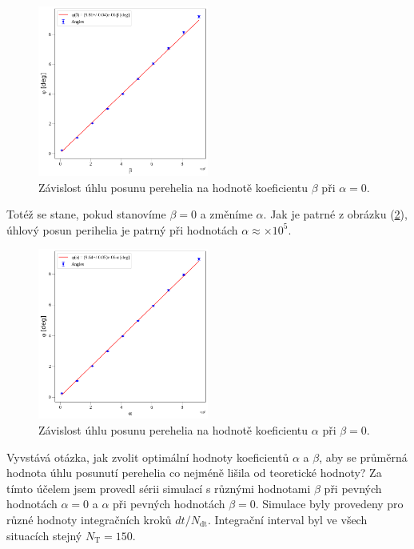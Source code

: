 \documentclass[a4paper,11pt,twocolumn]{article}
\begin{document}
            \begin{figure}
                \centering
                \includegraphics[width=0.5\textwidth]{phi_alpha.png}
                \caption{Závislost úhlu posunu perehelia na hodnotě koeficientu $\beta$ při $\alpha = 0$.}
                \label{fig:phi_alpha}
            \end{figure}

            Totéž se stane, pokud stanovíme $\beta = 0$ a změníme $\alpha$. Jak je patrné z obrázku (\ref{fig:phi_beta}), úhlový posun perihelia je patrný při hodnotách $\alpha \approx \times 10^5$.

            \begin{figure}
                \centering
                \includegraphics[width=0.5\textwidth]{phi_beta.png}
                \caption{Závislost úhlu posunu perehelia na hodnotě koeficientu $\alpha$ při $\beta = 0$.}
                \label{fig:phi_beta}
            \end{figure}

            Vyvstává otázka, jak zvolit optimální hodnoty koeficientů $\alpha$ a $\beta$, aby se průměrná hodnota úhlu posunutí perehelia co nejméně lišila od teoretické hodnoty? Za tímto účelem jsem provedl sérii simulací s různými hodnotami $\beta$ při pevných hodnotách $\alpha = 0$ a $\alpha$ při pevných hodnotách $\beta = 0$. Simulace byly provedeny pro různé hodnoty integračních kroků $dt/N_{\text{dt}}$. Integrační interval byl ve všech situacích stejný $N_{\text{T}} = 150$.  
            
\end{document}
